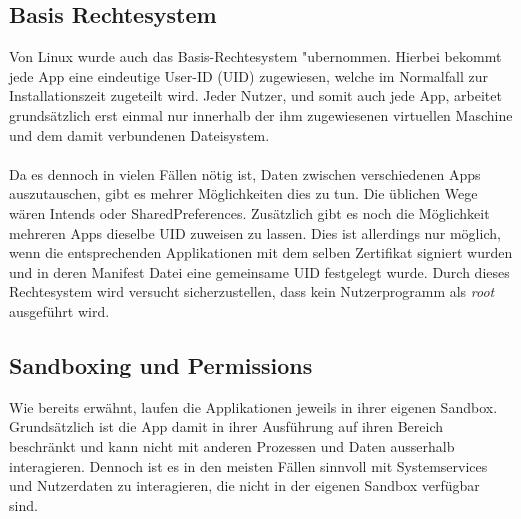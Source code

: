 	\subsection{Basis Rechtesystem}\label{sec:BasisRechteSystem}
	Von Linux wurde auch das Basis-Rechtesystem "ubernommen. Hierbei bekommt jede App eine eindeutige User-ID (UID) zugewiesen, welche im Normalfall zur Installationszeit zugeteilt wird. Jeder Nutzer, und somit auch jede App, arbeitet grundsätzlich erst einmal nur innerhalb der ihm zugewiesenen virtuellen Maschine und dem damit verbundenen Dateisystem.\\\\
	Da es dennoch in vielen Fällen nötig ist, Daten zwischen verschiedenen Apps auszutauschen, gibt es mehrer Möglichkeiten dies zu tun. Die üblichen Wege wären Intends oder SharedPreferences. Zusätzlich gibt es noch die Möglichkeit mehreren Apps dieselbe UID zuweisen zu lassen. Dies ist allerdings nur möglich, wenn die entsprechenden Applikationen mit dem selben Zertifikat signiert wurden und in deren Manifest Datei eine gemeinsame UID festgelegt wurde.
	Durch dieses Rechtesystem wird versucht sicherzustellen, dass kein Nutzerprogramm als \textit{root} ausgeführt wird.
	
	\subsection{Sandboxing und Permissions} \label{sec:SandBoxingNPermissions}
	Wie bereits erwähnt, laufen die Applikationen jeweils in ihrer eigenen Sandbox. Grundsätzlich ist die App damit in ihrer Ausführung auf ihren Bereich beschränkt und kann nicht mit anderen Prozessen und Daten ausserhalb interagieren. Dennoch ist es in den meisten Fällen sinnvoll mit Systemservices und Nutzerdaten zu interagieren, die nicht in der eigenen Sandbox verfügbar sind. 
	
